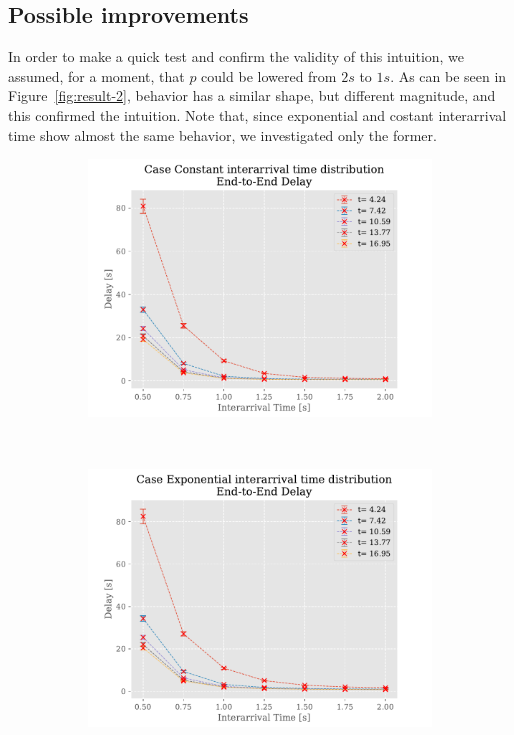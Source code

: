 \documentclass[a4paper,12pt]{article}
\begin{document}
\subsection{Possible improvements}
In order to make a quick test and confirm the validity of this intuition, we assumed, for a moment, that $p$ could be lowered from $2s$ to $1s$.
As can be seen in Figure~\ref{fig:result-2}, behavior has a similar shape, but different magnitude, and this confirmed the intuition.
Note that, since exponential and costant interarrival time show almost the same behavior, we investigated only the former.

\begin{figure}
  \centering
  \begin{subfigure}[b]{.45\textwidth}
    \includegraphics[width=\textwidth]{img/DelayP2Const.pdf}
    \label{fig:exp:const:delay}
  \end{subfigure}
  ~
  \begin{subfigure}[b]{.45\textwidth}
    \includegraphics[width=\textwidth]{img/DelayP2Exp.pdf}

\end{subfigure}
\end{figure}
\end{document}
